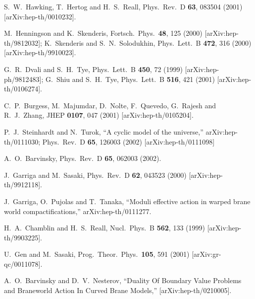 \documentclass[a4paper,preprint,nofootinbib,
                 showpacs,preprintnumbers,amsmath,amssymb]{revtex4}
\begin{document}
\begin{thebibliography}{99}
S.~W.~Hawking, T.~Hertog and H.~S.~Reall, 
Phys.\ Rev.\ D {\bf 63}, 083504 (2001) 
[arXiv:hep-th/0010232]. 
 
M.~Henningson and K.~Skenderis, 
Fortsch.\ Phys.\  {\bf 48}, 125 (2000) 
[arXiv:hep-th/9812032]; 
K.~Skenderis and S.~N.~Solodukhin, 
Phys.\ Lett.\ B {\bf 472}, 316 (2000) 
[arXiv:hep-th/9910023]. 
 
G.~R.~Dvali and S.~H.~Tye, 
Phys.\ Lett.\ B {\bf 450}, 72 (1999) 
[arXiv:hep-ph/9812483]; 
G.~Shiu and S.~H.~Tye, 
Phys.\ Lett.\ B {\bf 516}, 421 (2001) 
[arXiv:hep-th/0106274]. 
 
C.~P.~Burgess, M.~Majumdar, D.~Nolte, F.~Quevedo, G.~Rajesh and R.~J.~Zhang, 
JHEP {\bf 0107}, 047 (2001) 
[arXiv:hep-th/0105204]. 
 
P.~J.~Steinhardt and N.~Turok, 
``A cyclic model of the universe,'' 
arXiv:hep-th/0111030; 
Phys.\ Rev.\ D {\bf 65}, 126003 (2002) 
[arXiv:hep-th/0111098] 
 
A.~O.~Barvinsky, 
Phys.\ Rev.\ D {\bf 65}, 062003 (2002). 
 
J.~Garriga and M.~Sasaki, 
Phys.\ Rev.\ D {\bf 62}, 043523 (2000) 
[arXiv:hep-th/9912118]. 
 
J.~Garriga, O.~Pujolas and T.~Tanaka, 
``Moduli effective action in warped brane world compactifications,'' 
arXiv:hep-th/0111277. 
 
H.~A.~Chamblin and H.~S.~Reall, 
Nucl.\ Phys.\ B {\bf 562}, 133 (1999) 
[arXiv:hep-th/9903225]. 
 
U.~Gen and M.~Sasaki, 
Prog.\ Theor.\ Phys.\  {\bf 105}, 591 (2001) 
[arXiv:gr-qc/0011078]. 
 
A.~O.~Barvinsky and D.~V.~Nesterov, ``Duality Of Boundary Value  
Problems and Braneworld Action In Curved Brane Models,''  
[arXiv:hep-th/0210005]. 
 
 

\end{thebibliography}
\end{document}

